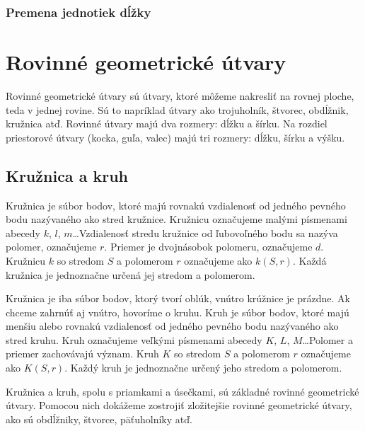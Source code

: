 \documentclass{report}
\begin{document}
\subsubsection{Premena jednotiek dĺžky}

\section{Rovinné geometrické útvary}

Rovinné geometrické útvary sú útvary, ktoré môžeme nakresliť na rovnej ploche, teda v jednej rovine. Sú to napríklad útvary ako trojuholník, štvorec, obdĺžnik, kružnica atď. Rovinné útvary majú dva rozmery: dĺžku a šírku. Na rozdiel priestorové útvary (kocka, guľa, valec) majú tri rozmery: dĺžku, šírku a výšku.

\subsection{Kružnica a kruh}

Kružnica je súbor bodov, ktoré majú rovnakú vzdialenosť od jedného pevného bodu nazývaného ako stred kružnice. Kružnicu označujeme malými písmenami abecedy \(k\), \(l\), \(m\)\dots Vzdialenosť stredu kružnice od ľubovoľného bodu sa nazýva polomer, označujeme \(r\). Priemer je dvojnásobok polomeru, označujeme \(d\). Kružnicu \(k\) so stredom \(S\) a polomerom \(r\) označujeme ako \(k(S, r)\). Každá kružnica je jednoznačne určená jej stredom a polomerom.

Kružnica je iba súbor bodov, ktorý tvorí oblúk, vnútro krúžnice je prázdne. Ak chceme zahrnúť aj vnútro, hovoríme o kruhu. Kruh je súbor bodov, ktoré majú menšiu alebo rovnakú vzdialenosť od jedného pevného bodu nazývaného ako stred kruhu. Kruh označujeme veľkými písmenami abecedy \(K\), \(L\), \(M\)\dots Polomer a priemer zachovávajú význam. Kruh \(K\) so stredom \(S\) a polomerom \(r\) označujeme ako \(K(S, r)\). Každý kruh je jednoznačne určený jeho stredom a polomerom.

Kružnica a kruh, spolu s priamkami a úsečkami, sú základné rovinné geometrické útvary. Pomocou nich dokážeme zostrojiť zložitejšie rovinné geometrické útvary, ako sú obdĺžniky, štvorce, päťuholníky atď.
\end{document}
